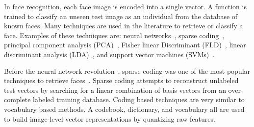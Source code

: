 
       

        In face recognition, each face image is encoded into a single vector. A function is trained to classify an
        unseen test image as an individual from the database of known faces. Many techniques are used in the
        literature to retrieve or classify a face. Examples of these techniques are: neural
        networks~\cite{turk_eigenfaces_1991, taigman_deepface_2014}, sparse coding~\cite{wright_robust_2009,
        jiang_label_2013}, principal component analysis (PCA)~\cite{craw_face_1992}, Fisher linear Discriminant
        (FLD)~\cite{liu_robust_2000}, linear discriminant analysis (LDA)~\cite{lu_face_2003}, and support vector
        machines (SVMs)~\cite{phillips_support_1998, levy_svm_minus_2013}.

        Before the neural network revolution~\cite{krizhevsky_imagenet_2012}, sparse coding was one of the most
        popular techniques to retrieve faces~\cite{aharon_k_svd_2006, wright_robust_2009, zhang_sparse_2011,
        jiang_label_2013}. Sparse coding attempts to reconstruct unlabeled test vectors by searching for a linear
        combination of basis vectors from an over-complete labeled training database. Coding based techniques are
        very similar to vocabulary based methods. A codebook, dictionary, and vocabulary all are used to build
        image-level vector representations by quantizing raw features.


